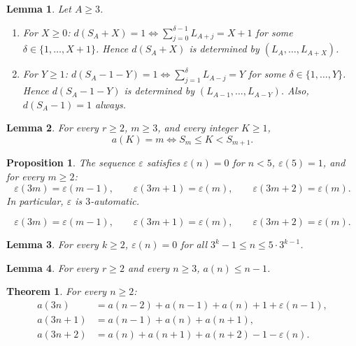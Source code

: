 \documentclass[10pt,a4paper]{amsart}
\newtheorem{lemma}{Lemma}
\newtheorem{proposition}{Proposition}
\newtheorem{theorem}{Theorem}
\begin{document}
\begin{lemma}\label{lem:local_projection}
Let $A\ge 3$.
\begin{enumerate}[label=(\roman*)]
  \item For $X\ge 0$: $d(S_A+X)=1\iff \sum_{j=0}^{\delta-1}L_{A+j}=X+1$
    for some $\delta\in\{1,\ldots,X+1\}$.
    Hence $d(S_A+X)$ is determined by $(L_A,\ldots,L_{A+X})$.
  \item For $Y\ge 1$: $d(S_A-1-Y)=1\iff \sum_{j=1}^{\delta}L_{A-j}=Y$
    for some $\delta\in\{1,\ldots,Y\}$.
    Hence $d(S_A-1-Y)$ is determined by $(L_{A-1},\ldots,L_{A-Y})$.
    Also, $d(S_A-1)=1$ always.
\end{enumerate}
\end{lemma}

\begin{lemma}\label{lem:anchor-characterization}
For every $r\ge 2$, $m\ge 3$, and every integer $K\ge 1$,
\[
  a(K)=m \iff S_m \le K < S_{m+1}.
\]
\end{lemma}

\begin{proposition}\label{prop:eps-auto}
The sequence $\varepsilon$ satisfies $\varepsilon(n)=0$ for $n<5$, $\varepsilon(5)=1$,
and for every $m\ge 2$:
\begin{equation}\label{eq:eps-rec}
  \varepsilon(3m)=\varepsilon(m-1),\qquad
  \varepsilon(3m+1)=\varepsilon(m),\qquad
  \varepsilon(3m+2)=\varepsilon(m).
\end{equation}
In particular, $\varepsilon$ is $3$-automatic.
\end{proposition}

\begin{equation}
  \varepsilon(3m)=\varepsilon(m-1),\qquad
  \varepsilon(3m+1)=\varepsilon(m),\qquad
  \varepsilon(3m+2)=\varepsilon(m).
\end{equation}

\begin{lemma}\label{lem:r3-gap}
For every $k\ge 2$, $\varepsilon(n)=0$ for all $3^k-1\le n\le 5\cdot 3^{k-1}$.
\end{lemma}

\begin{lemma}\label{lem:subdiag}
For every $r\ge 2$ and every $n\ge 3$, $a(n)\le n-1$.
\end{lemma}

\begin{theorem}\label{thm:r3}
For every $n\ge 2$:
\begin{align}
  a(3n)   &= a(n-2)+a(n-1)+a(n)+1+\varepsilon(n-1), \label{eq:r3a}\\
  a(3n+1) &= a(n-1)+a(n)+a(n+1),                    \label{eq:r3b}\\
  a(3n+2) &= a(n)+a(n+1)+a(n+2)-1-\varepsilon(n).   \label{eq:r3c}
\end{align}
\end{theorem}
\end{document}
